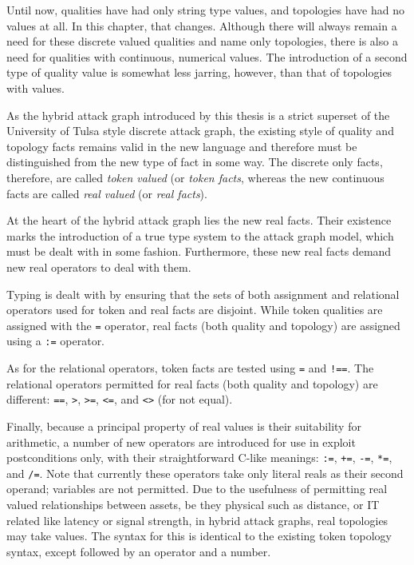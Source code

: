 Until now, qualities have had only string type values, and
topologies have had no values at all. In this chapter, that changes. Although
there will always remain a need for these discrete valued qualities and name
only topologies, there is also a need for qualities with 
continuous, numerical values. The introduction of a second type of quality
value is somewhat less jarring, however, than that of topologies with
values.

As the hybrid attack graph introduced by this thesis is a strict superset
of the University of Tulsa style discrete attack graph, the existing style
of quality and topology facts remains valid in the new language and therefore
must be distinguished from the new type of fact in some way. The discrete
only facts, therefore, are called \emph{token valued} (or \emph{token facts},
whereas the new continuous facts are called \emph{real valued} (or \emph{real
facts}).

At the heart of the hybrid attack graph lies the new real facts. Their
existence marks the introduction of a true type system to the attack graph
model, which must be dealt with in some fashion. Furthermore, these new real 
facts demand new real operators to deal with them.

Typing is dealt with by ensuring that the sets of both assignment and relational
operators used for token and real facts are disjoint. While token qualities are
assigned with the \texttt{=} operator, real facts (both quality and topology)
are assigned using a \texttt{:=} operator.

As for the relational operators, token facts are tested using \texttt{=} 
and \texttt{!==}. The relational operators permitted for real facts (both
quality and topology) are different: \texttt{==}, \texttt{>}, \texttt{>=},
\texttt{<=}, and \texttt{<>} (for not equal).

Finally, because a principal property of real values is their suitability for
arithmetic, a number of new operators are introduced for use in exploit
postconditions only, with their straightforward C-like meanings: \texttt{:=},
\texttt{+=}, \texttt{-=}, \texttt{*=}, and \texttt{/=}. Note that currently
these operators take only literal reals as their second operand; variables
are not permitted.
Due to the usefulness of permitting real valued relationships between assets,
be they physical such as distance, or IT related like latency or signal
strength, in hybrid attack graphs, real topologies may take values. The
syntax for this is identical to the existing token topology syntax, except
followed by an operator and a number.


